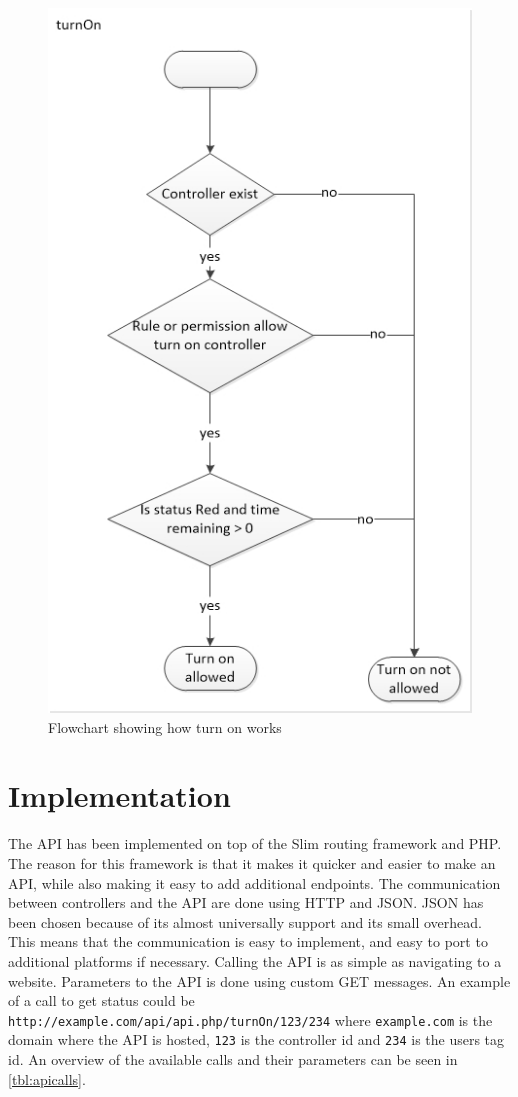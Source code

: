 
\begin{figure}[!h]
	\centering
		\includegraphics{images/turnOnAPI1.jpg}
	\caption{Flowchart showing how turn on works}
	\label{fig:turnOnAPI1}
\end{figure}
 
\section{Implementation}
The API has been implemented on top of the Slim routing framework and PHP. The reason for this framework is that it makes it quicker and easier to make an API, while also making it easy to add additional endpoints. The communication between controllers and the API are done using HTTP and JSON. JSON has been chosen because of its almost universally support and its small overhead. This means that the communication is easy to implement, and easy to port to additional platforms if necessary. Calling the API is as simple as navigating to a website. Parameters to the API is done using custom GET messages. An example of a call to get status could be \texttt{http://example.com/api/api.php/turnOn/123/234} where \texttt{example.com} is the domain where the API is hosted, \texttt{123} is the controller id and \texttt{234} is the users tag id. An overview of the available calls and their parameters can be seen in \autoref{tbl:apicalls}.

